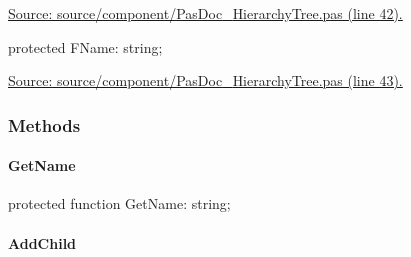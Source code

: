 \documentclass{report}
\newif\ifpdf
\begin{document}
\begin{list}{}
\par  \par
\href{https://github.com/pasdoc/pasdoc/blob/master/source/component/PasDoc_HierarchyTree.pas#L42}{Source: source/component/PasDoc{\_}HierarchyTree.pas (line 42).}\label{PasDoc_HierarchyTree.TPasItemNode-FName}
\item[\textbf{FName}\hfill]
\ifpdf
\begin{flushleft}
\fi
\begin{ttfamily}
protected FName: string;\end{ttfamily}

\ifpdf
\end{flushleft}
\fi


\par  \par
\href{https://github.com/pasdoc/pasdoc/blob/master/source/component/PasDoc_HierarchyTree.pas#L43}{Source: source/component/PasDoc{\_}HierarchyTree.pas (line 43).}\end{list}
\subsubsection*{\large{\textbf{Methods}}\normalsize\hspace{1ex}\hfill}
\paragraph*{GetName}\hspace*{\fill}

\label{PasDoc_HierarchyTree.TPasItemNode-GetName}
\begin{list}{}{
\setlength{\itemindent}{0cm}
\setlength{\listparindent}{0cm}
\setlength{\leftmargin}{\evensidemargin}
\addtolength{\leftmargin}{\tmplength}
\settowidth{\labelsep}{X}
\addtolength{\leftmargin}{\labelsep}
\setlength{\labelwidth}{\tmplength}
}
\item[\textbf{Declaration}\hfill]
\ifpdf
\begin{flushleft}
\fi
\begin{ttfamily}
protected function GetName: string;\end{ttfamily}

\ifpdf
\end{flushleft}
\fi

\end{list}
\paragraph*{AddChild}\hspace*{\fill}
\end{document}
